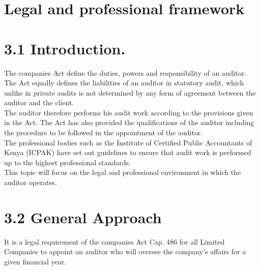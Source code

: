 \documentclass[10pt]{article}
\begin{document}
\section*{Legal and professional framework}
\section*{3.1 Introduction.}
The companies Act define the duties, powers and responsibility of an auditor. The Act equally defines the liabilities of an auditor in statutory audit, which unlike in private audits is not determined by any form of agreement between the auditor and the client.\\
The auditor therefore performs his audit work according to the provisions given in the Act. The Act has also provided the qualifications of the auditor including the procedure to be followed in the appointment of the auditor.\\
The professional bodies such as the Institute of Certified Public Accountants of Kenya (ICPAK) have set out guidelines to ensure that audit work is performed up to the highest professional standards.\\
This topic will focus on the legal and professional environment in which the auditor operates.

\section*{3.2 General Approach}
It is a legal requirement of the companies Act Cap. 486 for all Limited Companies to appoint an auditor who will oversee the company's affairs for a given financial year.
\end{document}
